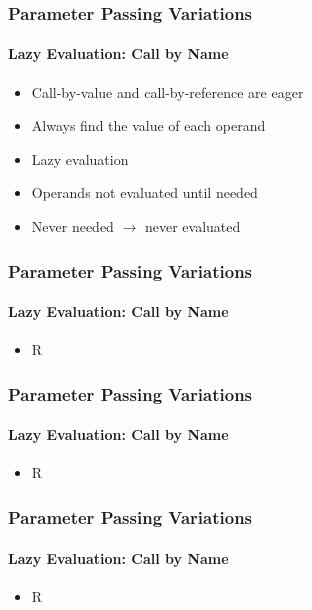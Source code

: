 \documentclass{beamer}
\newcommand{\arrow}{\(\rightarrow\)}
\begin{document}
\begin{frame}[fragile]
\frametitle{Parameter Passing Variations}
\framesubtitle{Lazy Evaluation: Call by Name}
\begin{scriptsize}
\begin{itemize}
\item<1-> Call-by-value and call-by-reference are eager

\item<1-> Always find the value of each operand

\item<2-> Lazy evaluation

\item<2-> Operands not evaluated until needed

\item<2-> Never needed \arrow{} never evaluated


\end{itemize}
\end{scriptsize}
\end{frame}

\begin{frame}[fragile]
\frametitle{Parameter Passing Variations}
\framesubtitle{Lazy Evaluation: Call by Name}
\begin{scriptsize}
\begin{itemize}
\item<1-> R

\end{itemize}
\end{scriptsize}
\end{frame}

\begin{frame}[fragile]
\frametitle{Parameter Passing Variations}
\framesubtitle{Lazy Evaluation: Call by Name}
\begin{scriptsize}
\begin{itemize}
\item<1-> R

\end{itemize}
\end{scriptsize}
\end{frame}

\begin{frame}[fragile]
\frametitle{Parameter Passing Variations}
\framesubtitle{Lazy Evaluation: Call by Name}
\begin{scriptsize}
\begin{itemize}
\item<1-> R

\end{itemize}
\end{scriptsize}
\end{frame}
\end{document}
